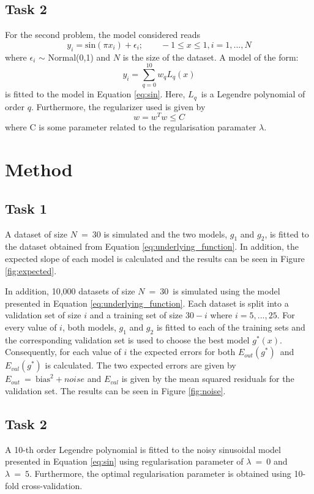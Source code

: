 \documentclass[a4paper,10pt]{article}
\begin{document}
\subsection{Task 2}
For the second problem, the model considered reads
\begin{equation}
  y_i = \text{sin}(\pi x_i) + \epsilon_i;\qquad -1 \leq x \leq1, i=1,...,N
  \label{eq:sin}
\end{equation}
where $\epsilon_i$ $\sim$ Normal(0,1) and $N$ is the
size of the dataset. A model of the form:
\begin{equation}
 y_i = \sum_{q=0}^{10} w_q L_q(x)
\end{equation}
is fitted to the model in Equation {\ref{eq:sin}}. Here, $L_q$ is a Legendre
polynomial of order $q$. Furthermore, the regularizer used is given by
\begin{equation}
  w = w^T w \leq C
\end{equation}
where C is some parameter related to the regularisation paramater $\lambda$.

\section{Method}
\subsection{Task 1}
A dataset of size $N\ = \ 30$ is simulated and the two models, $g_1$ and $g_2$, is fitted to
the dataset obtained from Equation {\ref{eq:underlying_function}}. In addition,
the expected slope of each model is calculated and the results can be seen in
Figure {\ref{fig:expected}}. \newline

In addition, 10,000 datasets of size $N\ =\ 30$ is simulated
using the model presented in Equation {\ref{eq:underlying_function}}. Each
dataset is split into a validation set of size $i$ and a training
set of size $30-i$ where $i = 5,...,25$. For every value of $i$, both models, $g_1$ and
$g_2$ is fitted to each of the training sets and the corresponding validation set is used
to choose the best model $g^*(x)$. Consequently, for each value of $i$
the expected errors for both $E_{out}(g^*)$ and $E_{val}(g^*)$ is calculated. The two
expected errors are given by $E_{out}\ =\ \text{bias}^2 + noise$ and
$E_{val}$ is given by the mean squared residuals for the validation set. The results
can be seen in Figure {\ref{fig:noise}}.

\subsection{Task 2}
A 10-th order Legendre polynomial is fitted to the noisy sinusoidal model presented
in Equation {\ref{eq:sin}} using regularisation parameter of
$\lambda\ =\ 0$ and $\lambda\ =\ 5$. Furthermore, the optimal
regularisation parameter is obtained using 10-fold cross-validation.
\end{document}
